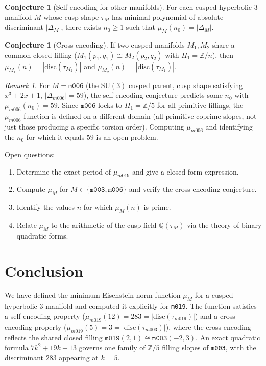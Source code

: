 \documentclass[11pt,a4paper]{article}
\theoremstyle{definition}
\newtheorem{conjecture}[theorem]{Conjecture}
\theoremstyle{remark}
\newtheorem{remark}[theorem]{Remark}
\newcommand{\Z}{\mathbb{Z}}
\newcommand{\Q}{\mathbb{Q}}
\newcommand{\mfld}[1]{\texttt{#1}}
\newcommand{\SU}{\mathrm{SU}}
\begin{document}
\begin{conjecture}[Self-encoding for other manifolds]
For each cusped hyperbolic 3-manifold $M$ whose cusp shape
$\tau_M$ has minimal polynomial of absolute discriminant
$|\Delta_M|$, there exists $n_0 \geq 1$ such that
$\mu_M(n_0) = |\Delta_M|$.
\end{conjecture}

\begin{conjecture}[Cross-encoding]
If two cusped manifolds $M_1, M_2$ share a common closed
filling ($M_1(p_1,q_1) \cong M_2(p_2,q_2)$ with
$H_1 = \Z/n$), then
$\mu_{M_1}(n) = |\mathrm{disc}(\tau_{M_2})|$
and $\mu_{M_2}(n) = |\mathrm{disc}(\tau_{M_1})|$.
\end{conjecture}

\begin{remark}
For $M = \mfld{m006}$ (the $\SU(3)$ cusped parent,
cusp shape satisfying $x^3+2x+1$, $|\Delta_{m006}| = 59$),
the self-encoding conjecture predicts some $n_0$ with
$\mu_{m006}(n_0) = 59$.
Since $\mfld{m006}$ locks to $H_1 = \Z/5$ for all
primitive fillings, the $\mu_{m006}$ function is defined
on a different domain (all primitive coprime slopes,
not just those producing a specific torsion order).
Computing $\mu_{m006}$ and identifying the $n_0$ for
which it equals $59$ is an open problem.
\end{remark}

Open questions:
\begin{enumerate}
\item Determine the exact period of $\mu_{m019}$ and
  give a closed-form expression.
\item Compute $\mu_M$ for $M \in \{\mfld{m003}, \mfld{m006}\}$
  and verify the cross-encoding conjecture.
\item Identify the values $n$ for which $\mu_M(n)$ is prime.
\item Relate $\mu_M$ to the arithmetic of the cusp field
  $\Q(\tau_M)$ via the theory of binary quadratic forms.
\end{enumerate}

\section{Conclusion}

We have defined the minimum Eisenstein norm function
$\mu_M$ for a cusped hyperbolic 3-manifold and computed
it explicitly for \mfld{m019}.
The function satisfies a self-encoding property
($\mu_{m019}(12) = 283 = |\mathrm{disc}(\tau_{m019})|$)
and a cross-encoding property
($\mu_{m019}(5) = 3 = |\mathrm{disc}(\tau_{m003})|$),
where the cross-encoding reflects the shared closed filling
$\mfld{m019}(2,1) \cong \mfld{m003}(-2,3)$.
An exact quadratic formula
$7k^2+19k+13$ governs one family of $\Z/5$ filling
slopes of \mfld{m003},
with the discriminant $283$ appearing at $k=5$.
\end{document}
